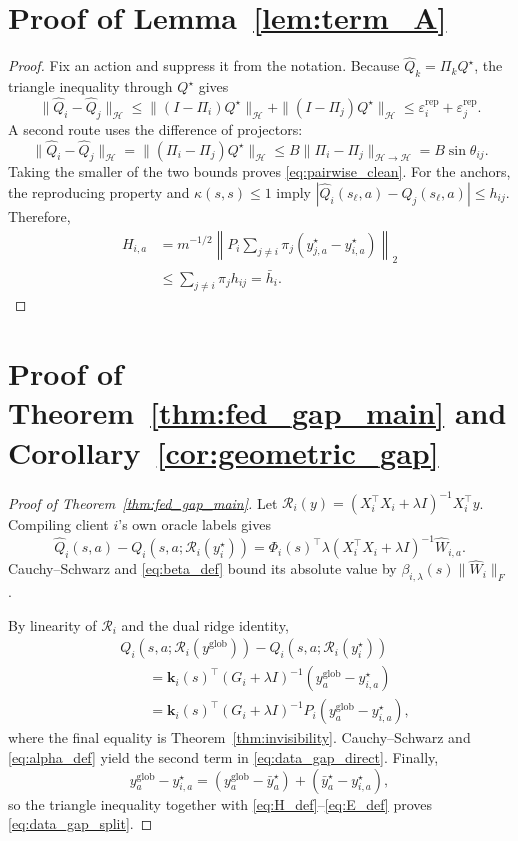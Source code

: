 \documentclass[sigconf,anonymous]{aamas}
\theoremstyle{plain}
\theoremstyle{definition}
\theoremstyle{remark}
\begin{document}
\section{Proof of Lemma~\ref{lem:term_A}}
\label{app:proof_termA}
\begin{proof}
Fix an action and suppress it from the notation.  Because
$\hat Q_k=\Pi_kQ^\star$, the triangle inequality through $Q^\star$ gives
\[
\|\hat Q_i-\hat Q_j\|_{\mathcal H}
\le
\|(I-\Pi_i)Q^\star\|_{\mathcal H}
+
\|(I-\Pi_j)Q^\star\|_{\mathcal H}
\le
\varepsilon_i^{\mathrm{rep}}+\varepsilon_j^{\mathrm{rep}}.
\]
A second route uses the difference of projectors:
\[
\|\hat Q_i-\hat Q_j\|_{\mathcal H}
=
\|(\Pi_i-\Pi_j)Q^\star\|_{\mathcal H}
\le
B\|\Pi_i-\Pi_j\|_{\mathcal H\to\mathcal H}
=
B\sin\theta_{ij}.
\]
Taking the smaller of the two bounds proves
\eqref{eq:pairwise_clean}.  For the anchors, the reproducing property
and $\kappa(s,s)\le1$ imply
$|\hat Q_i(s_\ell,a)-\hat Q_j(s_\ell,a)|\le h_{ij}$.
Therefore,
\begin{align*}
H_{i,a}
&=
m^{-1/2}
\left\|
P_i\sum_{j\ne i}\pi_j
(y^\star_{j,a}-y^\star_{i,a})
\right\|_2\\
&\le
\sum_{j\ne i}\pi_j h_{ij}
=
\bar h_i.
\end{align*}
\end{proof}

\section{Proof of Theorem~\ref{thm:fed_gap_main} and
Corollary~\ref{cor:geometric_gap}}
\label{app:proof_termB}

\begin{proof}[Proof of Theorem~\ref{thm:fed_gap_main}]
Let
$\mathcal R_i(y)=(X_i^\top X_i+\lambda I)^{-1}X_i^\top y$.
Compiling client $i$'s own oracle labels gives
\[
\hat Q_i(s,a)-Q_i(s,a;\mathcal R_i(y^\star_i))
=
\Phi_i(s)^\top
\lambda(X_i^\top X_i+\lambda I)^{-1}\hat W_{i,a}.
\]
Cauchy--Schwarz and \eqref{eq:beta_def} bound its absolute value by
$\beta_{i,\lambda}(s)\|\hat W_i\|_F$.

By linearity of $\mathcal R_i$ and the dual ridge identity,
\begin{align*}
&Q_i(s,a;\mathcal R_i(y^{\mathrm{glob}}))
-
Q_i(s,a;\mathcal R_i(y^\star_i))\\
&\qquad=
\mathbf k_i(s)^\top(G_i+\lambda I)^{-1}
(y^{\mathrm{glob}}_a-y^\star_{i,a})\\
&\qquad=
\mathbf k_i(s)^\top(G_i+\lambda I)^{-1}
P_i(y^{\mathrm{glob}}_a-y^\star_{i,a}),
\end{align*}
where the final equality is Theorem~\ref{thm:invisibility}.
Cauchy--Schwarz and \eqref{eq:alpha_def} yield the second term in
\eqref{eq:data_gap_direct}.  Finally,
\[
y^{\mathrm{glob}}_a-y^\star_{i,a}
=
(y^{\mathrm{glob}}_a-\bar y^\star_a)
+
(\bar y^\star_a-y^\star_{i,a}),
\]
so the triangle inequality together with
\eqref{eq:H_def}--\eqref{eq:E_def} proves
\eqref{eq:data_gap_split}.
\end{proof}
\end{document}
